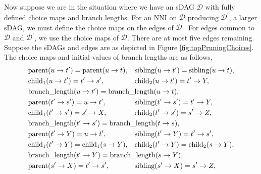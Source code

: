 \documentclass{article}
\begin{document}
Now suppose we are in the situation where we have an sDAG $\mathcal{D}$ with fully defined choice maps and branch lengths.
For an NNI on $\mathcal{D}$ producing $\mathcal{D}^\prime$, a larger sDAG, we must define the choice maps on the edges of $\mathcal{D}^\prime$. 
For edges common to $\mathcal{D}$ and $\mathcal{D}^\prime$, we use the choice maps of $\mathcal{D}$.
There are at most five edges remaining.
Suppose the sDAGs and edges are as depicted in Figure \ref{fig:topPruningChoices}. 
The choice maps and initial values of branch lengths are as follows,
\begin{align}\label{eq:topPruningChoices}
&\text{parent} (u\rightarrow t^\prime)  = \text{parent}(u \rightarrow t),&
&\text{sibling} (u\rightarrow t^\prime) = \text{sibling}(u \rightarrow t),\\\nonumber
&\text{child}_1 (u\rightarrow t^\prime) = t^\prime \rightarrow s^\prime,&
&\text{child}_2 (u\rightarrow t^\prime) = t^\prime \rightarrow Y,\\\nonumber
&\text{branch\_length} (u\rightarrow t^\prime) = \text{branch\_length}(u \rightarrow t),\hspace{-10em}&&\\\nonumber
&\text{parent} (t^\prime\rightarrow s^\prime) = u \rightarrow t^\prime,& 
&\text{sibling} (t^\prime\rightarrow s^\prime) = t^\prime \rightarrow Y,\\\nonumber 
&\text{child}_1 (t^\prime\rightarrow s^\prime) = s^\prime \rightarrow X,& 
&\text{child}_2 (t^\prime\rightarrow s^\prime) = s^\prime \rightarrow Z,\\\nonumber 
&\text{branch\_length} (t^\prime\rightarrow s^\prime) = \text{branch\_length}(t \rightarrow s),\hspace{-10em}&&\\\nonumber
&\text{parent} (t^\prime\rightarrow Y) = u \rightarrow t^\prime,&
&\text{sibling} (t^\prime\rightarrow Y) = t^\prime \rightarrow s^\prime,\\\nonumber
&\text{child}_1 (t^\prime\rightarrow Y) = \text{child}_1(s \rightarrow Y),&
&\text{child}_2 (t^\prime\rightarrow Y) = \text{child}_2(s \rightarrow Y),\\\nonumber
&\text{branch\_length} (t^\prime\rightarrow Y) = \text{branch\_length}(s \rightarrow Y),\hspace{-10em}&&\\\nonumber
&\text{parent} (s^\prime\rightarrow X) = t^\prime \rightarrow s^\prime,&
&\text{sibling} (s^\prime\rightarrow X) = s^\prime \rightarrow Z,\\\nonumber

\end{align}
\end{document}
